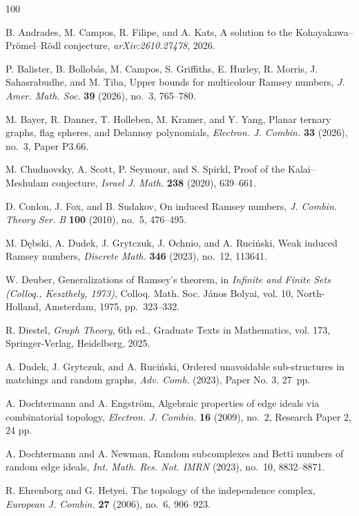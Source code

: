 \documentclass{article}
\theoremstyle{plain}
\theoremstyle{definition}
\begin{document}
\begin{thebibliography}{100} 

B. Andrades, M. Campos, R. Filipe, and A. Kats, A solution to the Kohayakawa--Pr\"omel--R\"odl conjecture, \emph{arXiv:2610.27478}, 2026.

P. Balister, B. Bollob\'as, M. Campos, S. Griffiths, E. Hurley, R. Morris, J. Sahasrabudhe, and M. Tiba, Upper bounds for multicolour Ramsey numbers, \emph{J. Amer. Math. Soc.} \textbf{39} (2026), no.~3, 765--780.

M. Bayer, R. Danner, T. Holleben, M. Kramer, and Y. Yang, Planar ternary graphs, flag spheres, and Delannoy polynomials, \emph{Electron. J. Combin.} \textbf{33} (2026), no.~3, Paper P3.66.

M. Chudnovsky, A. Scott, P. Seymour, and S. Spirkl, Proof of the Kalai--Meshulam conjecture, \emph{Israel J. Math.} \textbf{238} (2020), 639--661.

D. Conlon, J. Fox, and B. Sudakov, On induced Ramsey numbers, \emph{J. Combin. Theory Ser. B} \textbf{100} (2010), no.~5, 476--495.

M. D\k{e}bski, A. Dudek, J. Grytczuk, J. Ochnio, and A. Ruci\'nski, Weak induced Ramsey numbers, \emph{Discrete Math.} \textbf{346} (2023), no.~12, 113641.

W. Deuber, Generalizations of Ramsey's theorem, in \emph{Infinite and Finite Sets (Colloq., Keszthely, 1973)}, Colloq. Math. Soc. J\'anos Bolyai, vol. 10, North-Holland, Amsterdam, 1975, pp.~323--332.

R. Diestel, \emph{Graph Theory}, 6th ed., Graduate Texts in Mathematics, vol. 173, Springer-Verlag, Heidelberg, 2025.

A. Dudek, J. Grytczuk, and A. Ruci\'nski, Ordered unavoidable sub-structures in matchings and random graphs, \emph{Adv. Comb.} (2023), Paper No. 3, 27~pp.

A. Dochtermann and A. Engstr\"{o}m, Algebraic properties of edge ideals via combinatorial topology, \emph{Electron. J. Combin.} \textbf{16} (2009), no.~2, Research Paper 2, 24 pp.

A. Dochtermann and A. Newman, Random subcomplexes and Betti numbers of random edge ideals, \emph{Int. Math. Res. Not. IMRN} (2023), no.~10, 8832--8871.

R. Ehrenborg and G. Hetyei, The topology of the independence complex, \emph{European J. Combin.} \textbf{27} (2006), no.~6, 906--923.


\end{thebibliography}
\end{document}
